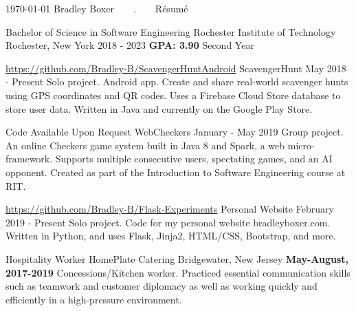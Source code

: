 \documentclass{awesome-cv}
\begin{document}
	\makecvheader[C]

	\makecvfooter
		{\today}
		{Bradley Boxer~~~~.~~~~R\'esum\'e}
		{}

		\begin{cventries}
			\cventry
				{Bachelor of Science in Software Engineering}
				{Rochester Institute of Technology}
				{Rochester, New York}
				{2018 - 2023}
                {\textbf{GPA: 3.90} Second Year}
		\end{cventries}

	\cvsection{PROJECTS}
		\begin{cventries}
			\cventry
				{\href{https://github.com/Bradley-B/ScavengerHuntAndroid}{https://github.com/Bradley-B/ScavengerHuntAndroid}}
				{ScavengerHunt}
				{May 2018 - Present}
				{}
				{Solo project. Android app. Create and share real-world scavenger hunts using GPS coordinates and QR codes. Uses a Firebase Cloud Store database to store user data. Written in Java and currently on the Google Play Store.}

			\cventry
				{Code Available Upon Request}
				{WebCheckers}
				{January - May 2019}
				{}
				{Group project. An online Checkers game system built in Java 8 and Spark, a web micro-framework. Supports multiple consecutive users, spectating games, and an AI opponent. Created as part of the Introduction to Software Engineering course at RIT.}

            		\cventry
                		{\href{https://github.com/Bradley-B/Flask-Experiments}{https://github.com/Bradley-B/Flask-Experiments}}
                		{Personal Website}
                		{February 2019 - Present}
                		{}
                		{Solo project. Code for my personal website bradleyboxer.com. Written in Python, and uses Flask, Jinja2, HTML/CSS, Bootstrap, and more.}

		\end{cventries}
	\cvsection{WORK EXPERIENCE}
		\begin{cventries}
			\cventry
				{Hospitality Worker}
				{HomePlate Catering}
				{Bridgewater, New Jersey}
               			{\textbf{May-August, 2017-2019}}
				{Concessions/Kitchen worker. Practiced essential communication skills such as teamwork and customer diplomacy as well as working quickly and efficiently in a high-pressure environment.}
		\end{cventries}
\end{document}
